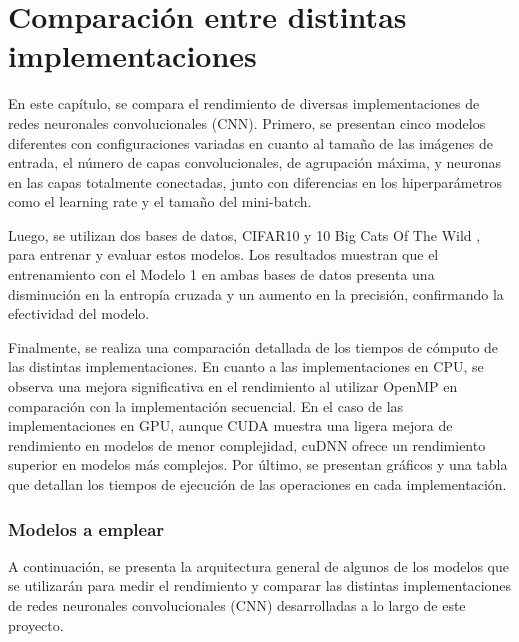 \chapter{Comparación entre distintas implementaciones}

En este capítulo, se compara el rendimiento de diversas implementaciones de redes neuronales convolucionales (CNN). Primero, se presentan cinco modelos diferentes con configuraciones variadas en cuanto al tamaño de las imágenes de entrada, el número de capas convolucionales, de agrupación máxima, y neuronas en las capas totalmente conectadas, junto con diferencias en los hiperparámetros como el learning rate y el tamaño del mini-batch.

Luego, se utilizan dos bases de datos, CIFAR10 \cite{cifar10} y 10 Big Cats Of The Wild \cite{10_big_cats}, para entrenar y evaluar estos modelos. Los resultados muestran que el entrenamiento con el Modelo 1 en ambas bases de datos presenta una disminución en la entropía cruzada y un aumento en la precisión, confirmando la efectividad del modelo.

Finalmente, se realiza una comparación detallada de los tiempos de cómputo de las distintas implementaciones. En cuanto a las implementaciones en CPU, se observa una mejora significativa en el rendimiento al utilizar OpenMP en comparación con la implementación secuencial. En el caso de las implementaciones en GPU, aunque CUDA muestra una ligera mejora de rendimiento en modelos de menor complejidad, cuDNN ofrece un rendimiento superior en modelos más complejos. Por último, se presentan gráficos y una tabla que detallan los tiempos de ejecución de las operaciones en cada implementación.

\subsection{Modelos a emplear}

A continuación, se presenta la arquitectura general de algunos de los modelos que se utilizarán para medir el rendimiento y comparar las distintas implementaciones de redes neuronales convolucionales (CNN) desarrolladas a lo largo de este proyecto.

